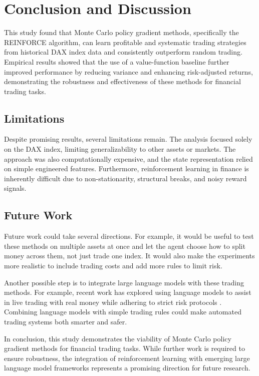 \section{Conclusion and Discussion}

This study found that Monte Carlo policy gradient methods, specifically the REINFORCE algorithm, can learn profitable and systematic trading strategies from historical DAX index data and consistently outperform random trading. Empirical results showed that the use of a value-function baseline further improved performance by reducing variance and enhancing risk-adjusted returns, demonstrating the robustness and effectiveness of these methods for financial trading tasks.

\subsection*{Limitations}

Despite promising results, several limitations remain. The analysis focused solely on the DAX index, limiting generalizability to other assets or markets. The approach was also computationally expensive, and the state representation relied on simple engineered features. Furthermore, reinforcement learning in finance is inherently difficult due to non-stationarity, structural breaks, and noisy reward signals.

\subsection*{Future Work}

Future work could take several directions. For example, it would be useful to test these methods on multiple assets at once and let the agent choose how to split money across them, not just trade one index. It would also make the experiments more realistic to include trading costs and add more rules to limit risk.

Another possible step is to integrate large language models with these trading methods. For example, recent work has explored using language models to assist in live trading with real money while adhering to strict risk protocols \citep{llmtradinglab2024}. Combining language models with simple trading rules could make automated trading systems both smarter and safer.

In conclusion, this study demonstrates the viability of Monte Carlo policy gradient methods \citep{williams1992simple} for financial trading tasks. 
While further work is required to ensure robustness, 
the integration of reinforcement learning \citep{hsinhungw2024} with emerging large language model frameworks 
represents a promising direction for future research.



